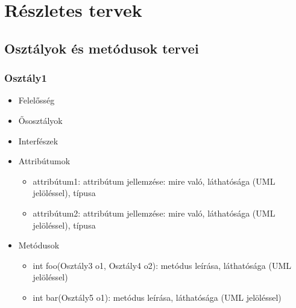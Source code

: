 %
\chapter{Részletes tervek}

\thispagestyle{fancy}

\section{Osztályok és metódusok tervei}

\subsection{Osztály1}
\begin{itemize}
\item Felelősség\newline
{}
\item Ősosztályok\newline
{}
\item Interfészek\newline
{}
\item Attribútumok\newline
{}
	\begin{itemize}
		\item attribútum1: attribútum jellemzése: mire való, láthatósága (UML jelöléssel), típusa
		\item attribútum2: attribútum jellemzése: mire való, láthatósága (UML jelöléssel), típusa
	\end{itemize}
\item Metódusok\newline
{}
	\begin{itemize}
		\item int foo(Osztály3 o1, Osztály4 o2): metódus leírása, láthatósága (UML jelöléssel)
		\item int bar(Osztály5 o1): metódus leírása, láthatósága (UML jelöléssel)
	\end{itemize}
\end{itemize}

